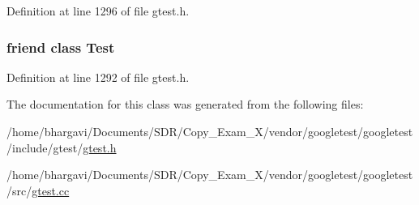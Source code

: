 Definition at line 1296 of file gtest.\+h.

\subsubsection[{\texorpdfstring{Test}{Test}}]{\setlength{\rightskip}{0pt plus 5cm}friend class {\bf Test}\hspace{0.3cm}{\ttfamily [friend]}}\hypertarget{classtesting_1_1_unit_test_a5b78b1c2e1fa07ffed92da365593eaa4}{}\label{classtesting_1_1_unit_test_a5b78b1c2e1fa07ffed92da365593eaa4}


Definition at line 1292 of file gtest.\+h.



The documentation for this class was generated from the following files\+:\begin{DoxyCompactItemize}
\item 
/home/bhargavi/\+Documents/\+S\+D\+R/\+Copy\+\_\+\+Exam\+\_\+X/vendor/googletest/googletest/include/gtest/\hyperlink{gtest_8h}{gtest.\+h}\item 
/home/bhargavi/\+Documents/\+S\+D\+R/\+Copy\+\_\+\+Exam\+\_\+X/vendor/googletest/googletest/src/\hyperlink{gtest_8cc}{gtest.\+cc}\end{DoxyCompactItemize}

